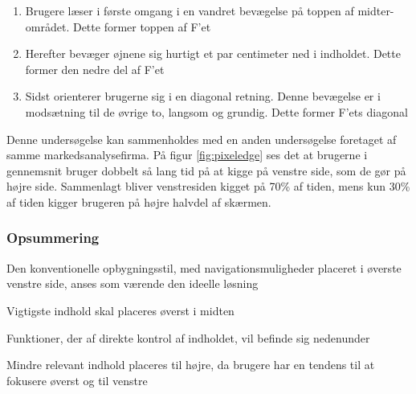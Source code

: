 \begin{enumerate}
    \item Brugere læser i første omgang i en vandret bevægelse på toppen af midter-området. Dette former toppen af F’et
    \item Herefter bevæger øjnene sig hurtigt et par centimeter ned i indholdet. Dette former den nedre del af F’et
    \item Sidst orienterer brugerne sig i en diagonal retning. Denne bevægelse er i modsætning til de øvrige to, langsom og grundig. Dette former F’ets diagonal
\end{enumerate}

Denne undersøgelse kan sammenholdes med en anden undersøgelse foretaget af samme markedsanalysefirma. På figur \ref{fig:pixeledge} ses det at brugerne i gennemsnit bruger dobbelt så lang tid på at kigge på venstre side, som de gør på højre side. Sammenlagt bliver venstresiden kigget på 70\% af tiden, mens kun 30\% af tiden kigger brugeren på højre halvdel af skærmen. \cite{f_shaped_pattern}
 

\subsubsection*{Opsummering}

\begin{itemize_small}
    \item Den konventionelle opbygningsstil, med navigationsmuligheder placeret i øverste venstre side, anses som værende den ideelle løsning
    \item Vigtigste indhold skal placeres øverst i midten
    \item Funktioner, der af direkte kontrol af indholdet, vil befinde sig nedenunder
    \item Mindre relevant indhold placeres til højre, da brugere har en tendens til at fokusere øverst og til venstre \cite{horizontal_attention_leans_left}
\end{itemize_small}


